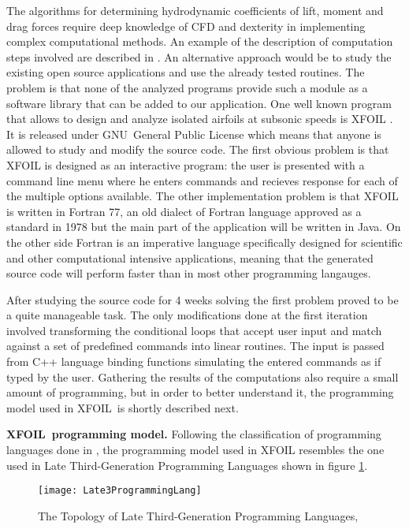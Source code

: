 The algorithms for determining hydrodynamic coefficients of lift, moment and
drag forces require deep knowledge of CFD and dexterity in implementing
complex computational methods. An example of the description of computation
steps involved are described in \cite{Bostan}. An alternative approach would be to study the existing open source
applications and use the already tested routines. The problem is that none
of the analyzed programs provide such a module as a software library that
can be added to our application. One well known program that allows to
design and analyze isolated airfoils at subsonic speeds is XFOIL \cite{Xfoil}
. It is released under GNU\ General Public License which means that anyone
is allowed to study and modify the source code. The first obvious problem is
that XFOIL is designed as an interactive program: the user is presented with
a command line menu where he enters commands and recieves response for each
of the multiple options available. The other implementation problem is that
XFOIL is written in Fortran 77, an old dialect of Fortran language approved
as a standard in 1978 but the main part of the application will be written
in Java. On the other side Fortran is an imperative language specifically
designed for scientific and other computational intensive applications,
meaning that the generated source code will perform faster than in most
other programming langauges.

After studying the source code for 4 weeks solving the first problem proved
to be a quite manageable task. The only modifications done at the first
iteration involved transforming the conditional loops that accept user input
and match against a set of predefined commands into linear routines. The
input is passed from C++ language binding functions simulating the entered
commands as if typed by the user. Gathering the results of the computations
also require a small amount of programming, but in order to better
understand it, the programming model used in XFOIL\ is shortly described
next.

{\bf XFOIL\ programming model.} Following the classification of programming languages done in \cite{booch}, the programming model used in XFOIL resembles the one used in Late Third-Generation Programming Languages shown in figure \ref{Late3ProgrammingLanguages}.

\begin{figure}[!ht]
\centering
\texttt{[image: Late3ProgrammingLang]}
\caption{The Topology of Late Third-Generation Programming Languages, \cite{booch}}\label{Late3ProgrammingLanguages}
\end{figure}

